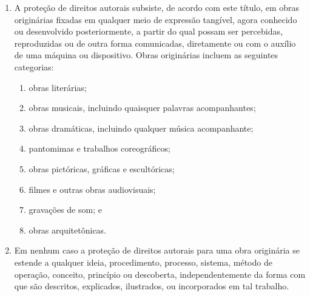 \documentclass[a5paper,10pt]{book}
\begin{document}
\begin{enumerate}[label=(\alph*)]
	\item A proteção de direitos autorais subsiste, de acordo com este título, em obras originárias fixadas em qualquer meio de expressão tangível, agora conhecido ou desenvolvido posteriormente, a partir do qual possam ser percebidas, reproduzidas ou de outra forma comunicadas, diretamente ou com o auxílio de uma máquina ou dispositivo. Obras originárias incluem as seguintes categorias:
	\begin{enumerate}[label=(\arabic*)]
		\item obras literárias;
		\item obras musicais, incluindo quaisquer palavras acompanhantes;
		\item obras dramáticas, incluindo qualquer música acompanhante;
		\item pantomimas e trabalhos coreográficos;
		\item obras pictóricas, gráficas e escultóricas;
		\item filmes e outras obras audiovisuais;
		\item gravações de som; e
		\item obras arquitetônicas.
	\end{enumerate}
	\item Em nenhum caso a proteção de direitos autorais para uma obra originária se estende a qualquer ideia, procedimento, processo, sistema, método de operação, conceito, princípio ou descoberta, independentemente da forma com que são descritos, explicados, ilustrados, ou incorporados em tal trabalho.
\end{enumerate}
\end{document}
